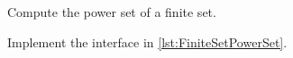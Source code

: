 
\begin{codeexercises}
    Compute the power set of a finite set.

    Implement the interface in \cref{lst:FiniteSetPowerSet}.
\end{codeexercises}



